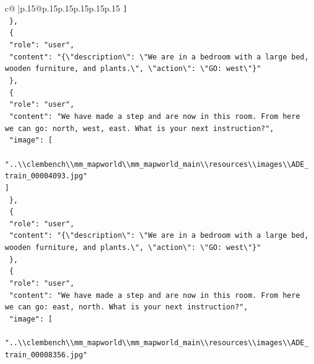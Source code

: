 \documentclass{article}
\begin{document}
{\begin{supertabular}{c@{$\;$}|p{.15\linewidth}@{}p{.15\linewidth}p{.15\linewidth}p{.15\linewidth}p{.15\linewidth}p{.15\linewidth}}
{{{\texttt{    {]}} \\
\texttt{  \},} \\
\texttt{  \{} \\
\texttt{    "role": "user",} \\
\texttt{    "content": "\{\textbackslash{}"description\textbackslash{}": \textbackslash{}"We are in a bedroom with a large bed, wooden furniture, and plants.\textbackslash{}", \textbackslash{}"action\textbackslash{}": \textbackslash{}"GO: west\textbackslash{}"\}"} \\
\texttt{  \},} \\
\texttt{  \{} \\
\texttt{    "role": "user",} \\
\texttt{    "content": "We have made a step and are now in this room. From here we can go: north, west, east. What is your next instruction?",} \\
\texttt{    "image": {[}} \\
\texttt{      "..\textbackslash{}\textbackslash{}clembench\textbackslash{}\textbackslash{}mm\_mapworld\textbackslash{}\textbackslash{}mm\_mapworld\_main\textbackslash{}\textbackslash{}resources\textbackslash{}\textbackslash{}images\textbackslash{}\textbackslash{}ADE\_train\_00004093.jpg"} \\
\texttt{    {]}} \\
\texttt{  \},} \\
\texttt{  \{} \\
\texttt{    "role": "user",} \\
\texttt{    "content": "\{\textbackslash{}"description\textbackslash{}": \textbackslash{}"We are in a bedroom with a large bed, wooden furniture, and plants.\textbackslash{}", \textbackslash{}"action\textbackslash{}": \textbackslash{}"GO: west\textbackslash{}"\}"} \\
\texttt{  \},} \\
\texttt{  \{} \\
\texttt{    "role": "user",} \\
\texttt{    "content": "We have made a step and are now in this room. From here we can go: east, north. What is your next instruction?",} \\
\texttt{    "image": {[}} \\
\texttt{      "..\textbackslash{}\textbackslash{}clembench\textbackslash{}\textbackslash{}mm\_mapworld\textbackslash{}\textbackslash{}mm\_mapworld\_main\textbackslash{}\textbackslash{}resources\textbackslash{}\textbackslash{}images\textbackslash{}\textbackslash{}ADE\_train\_00008356.jpg"} \\
}}}
\end{supertabular}}
\end{document}
